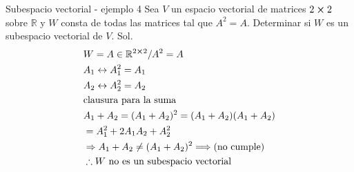 \begin{Example*} {Subespacio vectorial - ejemplo 4}
	Sea $V$ un espacio vectorial de matrices $2\cross2$ sobre $\mathbb{R}$ y $W$ consta de todas las matrices tal que $A^2=A$. Determinar si $W$ es un subespacio vectorial de $V$.
	Sol.
	\begin{align*}
		&W={A\in\mathbb{R}^{2\cross2}/A^2=A}\\
		&A_1\leftrightarrow A_1^2=A_1\\
		&A_2\leftrightarrow A_2^2=A_2\\
		&\text{clausura para la suma}\\
		&A_1+A_2=(A_1+A_2)^2=(A_1+A_2)(A_1+A_2)\\
		&=A_1^2+2A_1A_2+A_2^2\\
		&\Rightarrow A_1+A_2\ne (A_1+A_2)^2\Longrightarrow\text{(no cumple)}\\
		&\therefore W \text{ no es un subespacio vectorial}
	\end{align*}
\end{Example*}